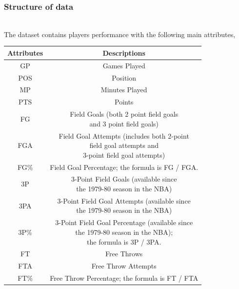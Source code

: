 \documentclass[format=sigconf]{acmart}
\begin{document}
\subsubsection{Structure of data}
\hfill\\
The dataset contains players performance with the following main attributes,
\begin{center}
    \begin{table}[H]
        \begin{tabular}{|c|c|}
            \hline
            \textbf{Attributes} & \textbf{Descriptions} \\
            \hline
            GP & Games Played \\
            \hline
            POS & Position \\
            \hline
            MP & Minutes Played \\
            \hline
            PTS & Points \\
            \hline
            FG & \makecell{Field Goals (both 2 point field goals \\ and 3 point field goals)} \\
            \hline
            FGA & \makecell{Field Goal Attempts (includes both 2-point \\ field goal attempts and \\3-point field goal attempts)} \\
            \hline
            FG\% & Field Goal Percentage; the formula is FG / FGA. \\
            \hline
            3P & \makecell{3-Point Field Goals (available since \\the 1979-80 season in the NBA)} \\
            \hline
            3PA & \makecell{3-Point Field Goal Attempts (available since \\the 1979-80 season in the NBA)} \\
            \hline
            3P\% & \makecell{3-Point Field Goal Percentage (available since \\the 1979-80 season in the NBA); \\the formula is 3P / 3PA.}\\
            \hline
            FT & Free Throws \\
            \hline
            FTA & Free Throw Attempts \\
            \hline
            FT\% & Free Throw Percentage; the formula is FT / FTA\\
            \hline

\end{tabular}
\end{table}
\end{center}
\end{document}
